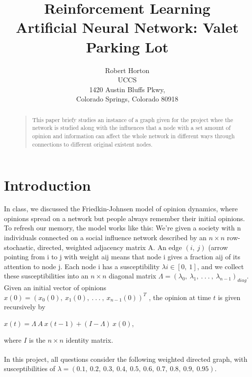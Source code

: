 \documentclass[letterpaper]{article}
\begin{document}
%
\title{Reinforcement Learning\\ Artificial Neural Network: Valet Parking Lot }
\author{Robert Horton\\
UCCS\\
1420 Austin Bluffs Pkwy,\\
Colorado Springs, Colorado 80918\\
}
\maketitle

\begin{abstract}
\begin{quote}
This paper briefy studies an instance of a graph given for the project whee the network is studied along with the influences that a node with a set amount of opinion and information can affect the whole network in different ways through connections to different original existent nodes.
\end{quote}
\end{abstract}

\section{Introduction}
In class, we discussed the Friedkin-Johnsen model of opinion dynamics, where opinions spread on a network but people always remember their initial opinions. To refresh our memory, the model works like this: We’re given a society with n individuals connected on a social influence network described by an $n \times n$ row-stochastic, directed, weighted adjacency matrix A. An edge $(i, \  j)$ (arrow pointing from i to j with weight aij means that node i gives a fraction aij of its attention to node j. Each node i has a susceptibility $\lambda i \in [0, \ 1]$, and we collect these susceptibilities into an $n \times n$ diagonal matrix $\Lambda = (\lambda_0, \ \lambda_1, \ . \ . \ . \ , \ \lambda_{n-1})_{diag}$. Given an initial vector of opinions $x(0) = (x_0(0), \ x_1(0), \ . \ . \ . \ , \ x_{n-1}(0))^T$ , the opinion at time $t$ is given recursively by
\begin{center}
	$x(t) = \Lambda \ A \ x(t - 1) + (I - \Lambda) \ x(0)$,\\ 
\end{center}
where $I$ is the $n \times n$ identity matrix. \\ \\
In this project, all questions consider the following weighted directed graph, with susceptibilities of $\lambda = (0.1,\ 0.2,\ 0.3,\ 0.4, \ 0.5, \ 0.6, \ 0.7, \ 0.8,\ 0.9, \ 0.95)$.  
\end{document}
